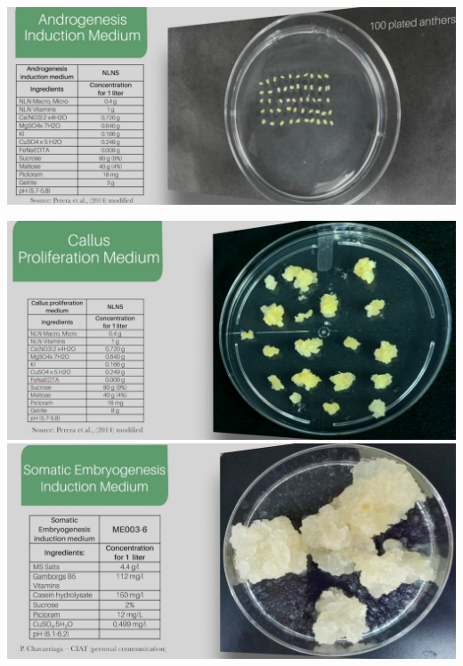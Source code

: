 \documentclass[
  ignorenonframetext,
  aspectratio=169]{beamer}
\newcommand{\ecolumns}{\end{columns}}
\begin{document}

\hypertarget{section-1}{%
\subsection{}\label{section-1}}

\begin{frame}{}
\begin{center}\includegraphics[width=0.48\linewidth]{../images/androgenesis_induction_medium} \end{center}

\includegraphics[width=0.48\linewidth]{../images/callus_induction}
\includegraphics[width=0.48\linewidth]{../images/somatic_embryogenesis_induction}
\end{frame}

\hypertarget{section-2}{%
\subsection{}\label{section-2}}
\end{document}

